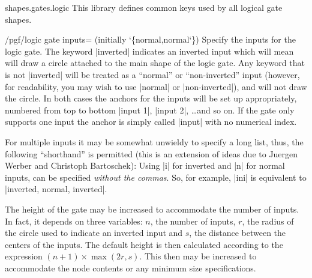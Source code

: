 \begin{pgflibrary}{shapes.gates.logic}
  This library defines common keys used by all logical gate shapes.

\begin{key}{/pgf/logic gate inputs= (initially \char`\{normal,normal\char`\})}
  \label{logic-gate-inputs}%
  Specify the inputs for the logic gate. The keyword |inverted|
  indicates an inverted input which will mean \pgfname{} will draw a
  circle attached to the main shape of the logic gate. Any keyword
  that is not |inverted| will be treated as a ``normal'' or
  ``non-inverted'' input (however, for readability, you may wish to
  use |normal| or |non-inverted|), and \pgfname{} will not draw the
  circle.
  In both cases the anchors for the inputs will be set
  up appropriately, numbered from top to bottom |input 1|, |input 2|,
  \ldots and so on. If the gate only supports one input the anchor
  is simply called |input| with no numerical index.

\begin{codeexample}[]
\end{codeexample}

  For multiple inputs it may be somewhat unwieldy to specify a long
  list, thus, the following ``shorthand'' is permitted (this is an
  extension of ideas due to Juergen Werber and Christoph Bartoschek):
  Using |i| for inverted and |n| for normal inputs, 
  can be specified \emph{without the commas}. So, for example,
  |ini| is equivalent to |inverted, normal, inverted|.

\begin{codeexample}[]
\end{codeexample}

\end{key}

The height of the gate may be increased to accommodate the number
of inputs. In fact, it depends on three variables:
$n$, the number of inputs, $r$, the radius of the circle used
to indicate an inverted input and $s$, the distance between
the centers of the inputs.
The default height is then calculated according to the expression
$(n+1)\times\max(2r,s)$. This then may
be increased to accommodate the node contents or any
minimum size specifications.


\end{pgflibrary}
